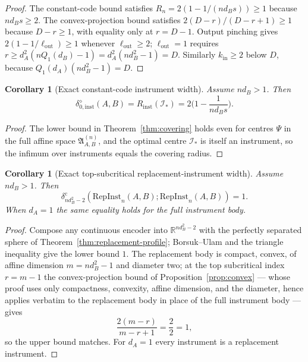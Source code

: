 \documentclass[11pt,a4paper]{article}
\newtheorem{corollary}[theorem]{Corollary}
\newcommand{\RepInst}{\mathrm{RepInst}}
\begin{document}
\begin{proof}
The constant-code bound satisfies $R_n=2(1-1/(nd_Bs))\ge1$ because $nd_Bs\ge2$. The convex-projection bound satisfies $2(D-r)/(D-r+1)\ge1$ because $D-r\ge1$, with equality only at $r=D-1$. Output pinching gives $2(1-1/\ell_{\mathrm{out}})\ge1$ whenever $\ell_{\mathrm{out}}\ge2$; $\ell_{\mathrm{out}}=1$ requires $r\ge d_A^2(nQ_1(d_B)-1)=d_A^2(nd_B^2-1)=D$. Similarly $k_{\mathrm{in}}\ge2$ below $D$, because $Q_1(d_A)(nd_B^2-1)=D$.
\end{proof}

\begin{corollary}[Exact constant-code instrument width]
\label{cor:constant-code}
Assume $nd_B>1$. Then
\[
\delta_{0,\mathrm{inst}}^{\diamond}(A,B)=R_{\mathrm{inst}}(\mathcal I_*)=2\Big(1-\frac1{nd_Bs}\Big).
\]
\end{corollary}

\begin{proof}
The lower bound in Theorem~\ref{thm:covering} holds even for centres $\Psi$ in the full affine space $\mathfrak A_{A,B}^{(n)}$, and the optimal centre $\mathcal I_*$ is itself an instrument, so the infimum over instruments equals the covering radius.
\end{proof}

\begin{corollary}[Exact top-subcritical replacement-instrument width]
\label{cor:top-subcritical}
Assume $nd_B>1$. Then
\[
\delta_{nd_B^2-2}^{\mathrm c}(\RepInst_n(A,B);\RepInst_n(A,B))=1.
\]
When $d_A=1$ the same equality holds for the full instrument body.
\end{corollary}

\begin{proof}
Compose any continuous encoder into $\mathbb R^{nd_B^2-2}$ with the perfectly separated sphere of Theorem~\ref{thm:replacement-profile}; Borsuk--Ulam and the triangle inequality give the lower bound $1$. The replacement body is compact, convex, of affine dimension $m=nd_B^2-1$ and diameter two; at the top subcritical index $r=m-1$ the convex-projection bound of Proposition~\ref{prop:convex} --- whose proof uses only compactness, convexity, affine dimension, and the diameter, hence applies verbatim to the replacement body in place of the full instrument body --- gives
\[
\frac{2(m-r)}{m-r+1}=\frac{2}{2}=1,
\]
so the upper bound matches. For $d_A=1$ every instrument is a replacement instrument.
\end{proof}
\end{document}
